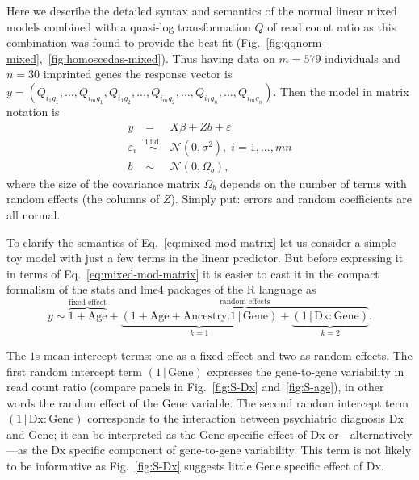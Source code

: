 \documentclass[letterpaper]{article}
\begin{document}
Here we describe the detailed syntax and semantics of the normal linear mixed
models combined with a quasi-log transformation \(Q\) of read count ratio as
this combination was found to provide the best fit
(Fig.~\ref{fig:qqnorm-mixed},~\ref{fig:homoscedas-mixed}).  Thus having data
on \(m=579\) individuals and \(n=30\) imprinted genes the response vector is
\(y=(Q_{i_1g_1},...,Q_{i_mg_1},Q_{i_1g_2},...,Q_{i_mg_2},...,Q_{i_1g_n},...,Q_{i_mg_n})\).
Then the model in matrix notation is
\begin{eqnarray}
\label{eq:mixed-mod-matrix}
y &=& X \beta + Z b + \varepsilon \\
\varepsilon_i &\overset{\text{i.i.d.}}{\sim}& \mathcal{N}(0, \sigma^2),\;
i=1,...,mn \\
b &\sim& \mathcal{N}(0, \Omega_b),
\end{eqnarray}
where the size of the covariance matrix \(\Omega_b\) depends on the number of
terms with random effects (the columns of \(Z\)).  Simply put: errors and
random coefficients are all normal.

To clarify the semantics of Eq.~\ref{eq:mixed-mod-matrix} let us consider a
simple toy model with just a few terms in the linear predictor.  But before
expressing it in terms of Eq.~\ref{eq:mixed-mod-matrix} it is easier
to cast it in the compact formalism of the stats and lme4 packages of the R
language as
\begin{equation}
\label{eq:toy-mod-r}
y \sim \overbrace{1 + \mathrm{Age}}^{\text{fixed effect}} +
\overbrace{\underbrace{(1 + \mathrm{Age} + \mathrm{Ancestry.1} \,|\,
\mathrm{Gene})}_{k=1} +
\underbrace{(1 \,|\, \mathrm{Dx}:\mathrm{Gene})}_{k=2}}^{\text{random
effects}}.
\end{equation}

The \(1\)s mean intercept terms: one as a fixed effect and two as random
effects.  The first random intercept term \((1\,|\,\mathrm{Gene})\) expresses
the gene-to-gene variability in read count ratio (compare panels in
Fig.~\ref{fig:S-Dx} and~\ref{fig:S-age}), in other words the random effect of
the \(\mathrm{Gene}\) variable.  The second random intercept term
\((1\,|\,\mathrm{Dx}:\mathrm{Gene})\) corresponds to the interaction between
psychiatric diagnosis \(\mathrm{Dx}\) and \(\mathrm{Gene}\); it can be
interpreted as the \(\mathrm{Gene}\) specific effect of \(\mathrm{Dx}\)
or---alternatively---as the \(\mathrm{Dx}\) specific component of gene-to-gene
variability.  This term is not likely to be informative as Fig.~\ref{fig:S-Dx}
suggests little \(\mathrm{Gene}\) specific effect of \(\mathrm{Dx}\).
\end{document}
